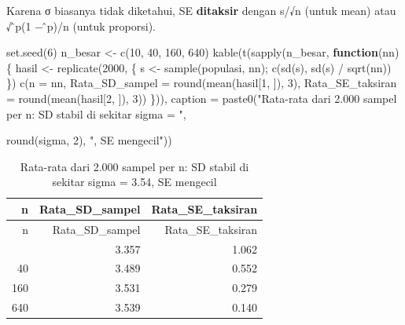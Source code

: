 \documentclass[
  indonesian,
  letterpaper,
]{book}
\newenvironment{Shaded}{\begin{snugshade}}{\end{snugshade}}
\newcommand{\AttributeTok}[1]{\textcolor[rgb]{0.40,0.45,0.13}{#1}}
\newcommand{\ControlFlowTok}[1]{\textcolor[rgb]{0.00,0.23,0.31}{\textbf{#1}}}
\newcommand{\DecValTok}[1]{\textcolor[rgb]{0.68,0.00,0.00}{#1}}
\newcommand{\FunctionTok}[1]{\textcolor[rgb]{0.28,0.35,0.67}{#1}}
\newcommand{\NormalTok}[1]{\textcolor[rgb]{0.00,0.23,0.31}{#1}}
\newcommand{\OtherTok}[1]{\textcolor[rgb]{0.00,0.23,0.31}{#1}}
\newcommand{\SpecialCharTok}[1]{\textcolor[rgb]{0.37,0.37,0.37}{#1}}
\newcommand{\StringTok}[1]{\textcolor[rgb]{0.13,0.47,0.30}{#1}}
\begin{document}
Karena σ biasanya tidak diketahui, SE \textbf{ditaksir} dengan s/√n
(untuk mean) atau √ ̂p(1 − ̂p)/n (untuk proporsi).

\begin{Shaded}
\begin{Highlighting}[]
\FunctionTok{set.seed}\NormalTok{(}\DecValTok{6}\NormalTok{)}
\NormalTok{n\_besar }\OtherTok{\textless{}{-}} \FunctionTok{c}\NormalTok{(}\DecValTok{10}\NormalTok{, }\DecValTok{40}\NormalTok{, }\DecValTok{160}\NormalTok{, }\DecValTok{640}\NormalTok{)}
\FunctionTok{kable}\NormalTok{(}\FunctionTok{t}\NormalTok{(}\FunctionTok{sapply}\NormalTok{(n\_besar, }\ControlFlowTok{function}\NormalTok{(nn) \{}
\NormalTok{hasil }\OtherTok{\textless{}{-}} \FunctionTok{replicate}\NormalTok{(}\DecValTok{2000}\NormalTok{, \{ s }\OtherTok{\textless{}{-}} \FunctionTok{sample}\NormalTok{(populasi, nn); }\FunctionTok{c}\NormalTok{(}\FunctionTok{sd}\NormalTok{(s), }\FunctionTok{sd}\NormalTok{(s) }\SpecialCharTok{/} \FunctionTok{sqrt}\NormalTok{(nn)) \})}
\FunctionTok{c}\NormalTok{(}\AttributeTok{n =}\NormalTok{ nn, }\AttributeTok{Rata\_SD\_sampel =} \FunctionTok{round}\NormalTok{(}\FunctionTok{mean}\NormalTok{(hasil[}\DecValTok{1}\NormalTok{, ]), }\DecValTok{3}\NormalTok{),}
\AttributeTok{Rata\_SE\_taksiran =} \FunctionTok{round}\NormalTok{(}\FunctionTok{mean}\NormalTok{(hasil[}\DecValTok{2}\NormalTok{, ]), }\DecValTok{3}\NormalTok{))}
\NormalTok{\})), }\AttributeTok{caption =} \FunctionTok{paste0}\NormalTok{(}\StringTok{"Rata{-}rata dari 2.000 sampel per n: SD stabil di sekitar sigma = "}\NormalTok{,}

\FunctionTok{round}\NormalTok{(sigma, }\DecValTok{2}\NormalTok{), }\StringTok{", SE mengecil"}\NormalTok{))}
\end{Highlighting}
\end{Shaded}

\begin{longtable}[]{@{}rrr@{}}
\caption{Rata-rata dari 2.000 sampel per n: SD stabil di sekitar sigma =
3.54, SE mengecil}\tabularnewline
\toprule\noalign{}
n & Rata\_SD\_sampel & Rata\_SE\_taksiran \\
\midrule\noalign{}
\endfirsthead
\toprule\noalign{}
n & Rata\_SD\_sampel & Rata\_SE\_taksiran \\
\midrule\noalign{}
\endhead
\bottomrule\noalign{}
\endlastfoot
10 & 3.357 & 1.062 \\
40 & 3.489 & 0.552 \\
160 & 3.531 & 0.279 \\
640 & 3.539 & 0.140 \\
\end{longtable}
\end{document}
